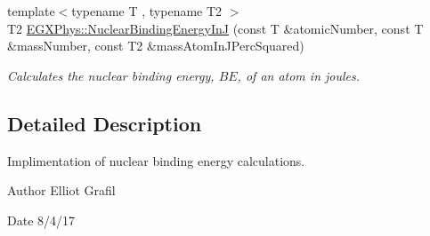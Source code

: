 \begin{DoxyCompactItemize}
{\footnotesize template$<$typename T , typename T2 $>$ }\\T2 \mbox{\hyperlink{group___e_g_x_phys-_nuclear_binding_energy_gae48a95188d9b71b36d02babf227b9449}{E\+G\+X\+Phys\+::\+Nuclear\+Binding\+Energy\+InJ}} (const T \&atomic\+Number, const T \&mass\+Number, const T2 \&mass\+Atom\+In\+J\+Perc\+Squared)
\begin{DoxyCompactList}\small\item\em Calculates the nuclear binding energy, $BE$, of an atom in joules. \end{DoxyCompactList}\end{DoxyCompactItemize}


\subsection{Detailed Description}
Implimentation of nuclear binding energy calculations. 

\begin{DoxyAuthor}{Author}
Elliot Grafil 
\end{DoxyAuthor}
\begin{DoxyDate}{Date}
8/4/17 
\end{DoxyDate}
